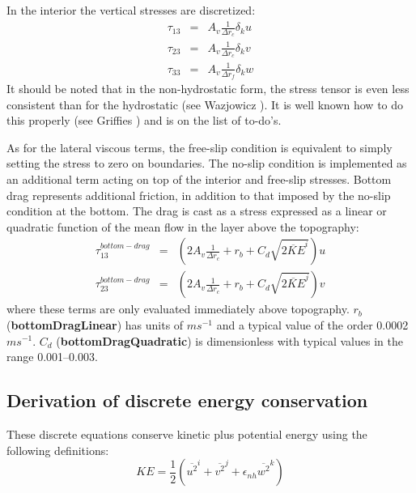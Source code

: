 In the interior the vertical stresses are discretized:
\begin{eqnarray}
\tau_{13} & = & A_v \frac{1}{\Delta r_c} \delta_k u \\
\tau_{23} & = & A_v \frac{1}{\Delta r_c} \delta_k v \\
\tau_{33} & = & A_v \frac{1}{\Delta r_f} \delta_k w
\end{eqnarray}
It should be noted that in the non-hydrostatic form, the stress tensor
is even less consistent than for the hydrostatic (see Wazjowicz
\cite{Waojz}). It is well known how to do this properly (see Griffies
\cite{Griffies}) and is on the list of to-do's.



As for the lateral viscous terms, the free-slip condition is
equivalent to simply setting the stress to zero on boundaries.  The
no-slip condition is implemented as an additional term acting on top
of the interior and free-slip stresses. Bottom drag represents
additional friction, in addition to that imposed by the no-slip
condition at the bottom. The drag is cast as a stress expressed as a
linear or quadratic function of the mean flow in the layer above the
topography:
\begin{eqnarray}
\tau_{13}^{bottom-drag} & = &
\left(
2 A_v \frac{1}{\Delta r_c}
+ r_b
+ C_d \sqrt{ \overline{2 KE}^i }
\right) u \\
\tau_{23}^{bottom-drag} & = &
\left(
2 A_v \frac{1}{\Delta r_c}
+ r_b
+ C_d \sqrt{ \overline{2 KE}^j }
\right) v
\end{eqnarray}
where these terms are only evaluated immediately above topography.
$r_b$ ({\bf bottomDragLinear}) has units of $m s^{-1}$ and a typical value
of the order 0.0002 $m s^{-1}$. $C_d$ ({\bf bottomDragQuadratic}) is
dimensionless with typical values in the range 0.001--0.003.


\subsection{Derivation of discrete energy conservation}

These discrete equations conserve kinetic plus potential energy using the
following definitions:
\begin{equation}
KE = \frac{1}{2} \left( \overline{ u^2 }^i + \overline{ v^2 }^j +
\epsilon_{nh} \overline{ w^2 }^k \right)
\end{equation}

